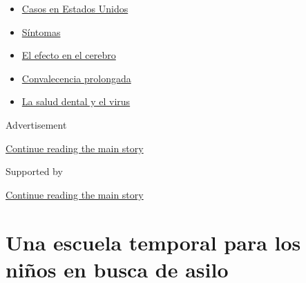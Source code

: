 \begin{itemize}
\tightlist
\item
  \href{https://www.nytimes3xbfgragh.onion/es/interactive/2020/espanol/mundo/coronavirus-en-estados-unidos.html?name=styln-coronavirus-es\&region=TOP_BANNER\&block=storyline_menu_recirc\&action=click\&pgtype=Article\&impression_id=ab230981-f4cb-11ea-9a82-8ff3d0b97313\&variant=undefined}{Casos
  en Estados Unidos}
\item
  \href{https://www.nytimes3xbfgragh.onion/es/interactive/2020/08/06/espanol/ciencia-y-tecnologia/tengo-covid-19-sintomas.html?name=styln-coronavirus-es\&region=TOP_BANNER\&block=storyline_menu_recirc\&action=click\&pgtype=Article\&impression_id=ab233090-f4cb-11ea-9a82-8ff3d0b97313\&variant=undefined}{Síntomas}
\item
  \href{https://www.nytimes3xbfgragh.onion/es/2020/09/11/espanol/ciencia-y-tecnologia/cerebro-coronavirus.html?name=styln-coronavirus-es\&region=TOP_BANNER\&block=storyline_menu_recirc\&action=click\&pgtype=Article\&impression_id=ab233091-f4cb-11ea-9a82-8ff3d0b97313\&variant=undefined}{El
  efecto en el cerebro}
\item
  \href{https://www.nytimes3xbfgragh.onion/es/2020/09/09/espanol/ciencia-y-tecnologia/salud-mental-coronavirus.html?name=styln-coronavirus-es\&region=TOP_BANNER\&block=storyline_menu_recirc\&action=click\&pgtype=Article\&impression_id=ab233092-f4cb-11ea-9a82-8ff3d0b97313\&variant=undefined}{Convalecencia
  prolongada}
\item
  \href{https://www.nytimes3xbfgragh.onion/es/2020/09/08/espanol/ciencia-y-tecnologia/dentistas-covid-dientes.html?name=styln-coronavirus-es\&region=TOP_BANNER\&block=storyline_menu_recirc\&action=click\&pgtype=Article\&impression_id=ab233093-f4cb-11ea-9a82-8ff3d0b97313\&variant=undefined}{La
  salud dental y el virus}
\end{itemize}

Advertisement

\protect\hyperlink{after-top}{Continue reading the main story}

Supported by

\protect\hyperlink{after-sponsor}{Continue reading the main story}

\hypertarget{una-escuela-temporal-para-los-niuxf1os-en-busca-de-asilo}{%
\section{Una escuela temporal para los niños en busca de
asilo}\label{una-escuela-temporal-para-los-niuxf1os-en-busca-de-asilo}}

